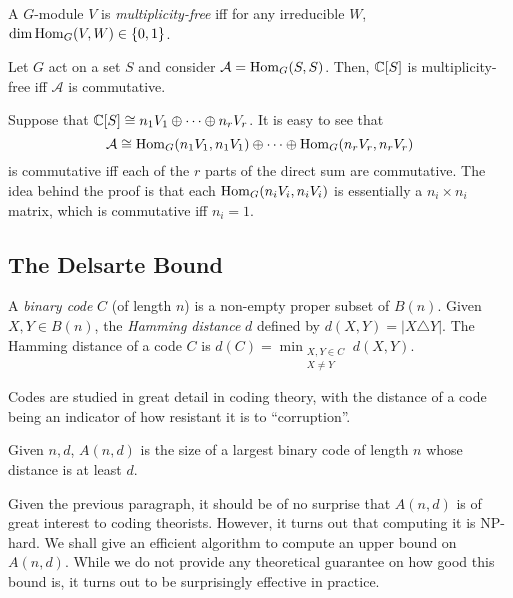 	\begin{fdef}
		A $G$-module $V$ is \emph{multiplicity-free} iff for any irreducible $W$, $\dim \operatorname{Hom}_G(V,W) \in \{0,1\}$.
	\end{fdef}

	\begin{flem}
		Let $G$ act on a set $S$ and consider $\mathcal{A} = \operatorname{Hom}_G(S,S)$. Then, $\mathbb{C}[S]$ is multiplicity-free iff $\mathcal{A}$ is commutative.
	\end{flem}
	Suppose that $\mathbb{C}[S] \cong n_1 V_1 \oplus \cdots \oplus n_r V_r$. It is easy to see that
	\[ \mathcal{A} \cong \operatorname{Hom}_G(n_1 V_1, n_1 V_1) \oplus \cdots \oplus \operatorname{Hom}_G(n_r V_r, n_r V_r) \]
	is commutative iff each of the $r$ parts of the direct sum are commutative. The idea behind the proof is that each $\operatorname{Hom}_G(n_i V_i, n_i V_i)$ is essentially a $n_i \times n_i$ matrix, which is commutative iff $n_i = 1$.

\subsection{The Delsarte Bound}

	\begin{fdef}
		A \emph{binary code} $C$ (of length $n$) is a non-empty proper subset of $B(n)$. Given $X,Y \in B(n)$, the \emph{Hamming distance} $d$ defined by $d(X,Y) = |X \triangle Y|$. The Hamming distance of a code $C$ is $d(C) = \min_{\substack{X,Y \in C \\ X \ne Y}} d(X,Y)$.
	\end{fdef}

	Codes are studied in great detail in coding theory, with the distance of a code being an indicator of how resistant it is to ``corruption''.

	\begin{fdef}
		Given $n,d$, $A(n,d)$ is the size of a largest binary code of length $n$ whose distance is at least $d$.
	\end{fdef}

	Given the previous paragraph, it should be of no surprise that $A(n,d)$ is of great interest to coding theorists. However, it turns out that computing it is \textsf{NP}-hard. We shall give an efficient algorithm to compute an upper bound on $A(n,d)$. While we do not provide any theoretical guarantee on how good this bound is, it turns out to be surprisingly effective in practice.